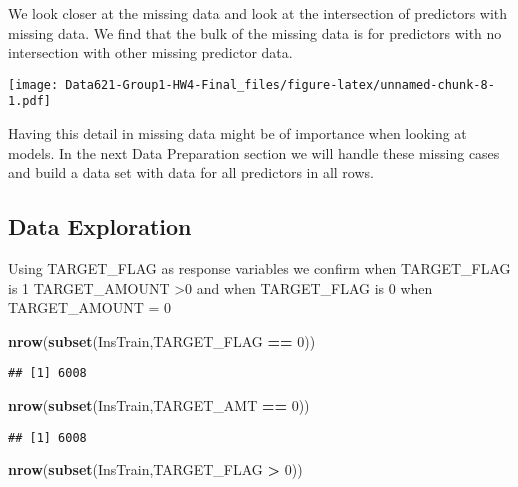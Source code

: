 \documentclass[]{article}
\newenvironment{Shaded}{\begin{snugshade}}{\end{snugshade}}
\newcommand{\DecValTok}[1]{\textcolor[rgb]{0.00,0.00,0.81}{#1}}
\newcommand{\KeywordTok}[1]{\textcolor[rgb]{0.13,0.29,0.53}{\textbf{#1}}}
\newcommand{\NormalTok}[1]{#1}
\newcommand{\OperatorTok}[1]{\textcolor[rgb]{0.81,0.36,0.00}{\textbf{#1}}}
\newcommand{\StringTok}[1]{\textcolor[rgb]{0.31,0.60,0.02}{#1}}
\begin{document}
We look closer at the missing data and look at the intersection of
predictors with missing data. We find that the bulk of the missing data
is for predictors with no intersection with other missing predictor
data.

\texttt{[image: Data621-Group1-HW4-Final\_files/figure-latex/unnamed-chunk-8-1.pdf]}

Having this detail in missing data might be of importance when looking
at models. In the next Data Preparation section we will handle these
missing cases and build a data set with data for all predictors in all
rows.

\hypertarget{data-exploration-1}{%
\subsection{Data Exploration}\label{data-exploration-1}}

Using TARGET\_FLAG as response variables we confirm when TARGET\_FLAG is
1 TARGET\_AMOUNT \textgreater0 and when TARGET\_FLAG is 0 when
TARGET\_AMOUNT = 0

\begin{Shaded}
\begin{Highlighting}[]
\KeywordTok{nrow}\NormalTok{(}\KeywordTok{subset}\NormalTok{(InsTrain,TARGET_FLAG }\OperatorTok{==}\StringTok{ }\DecValTok{0}\NormalTok{))}
\end{Highlighting}
\end{Shaded}

\begin{verbatim}
## [1] 6008
\end{verbatim}

\begin{Shaded}
\begin{Highlighting}[]
\KeywordTok{nrow}\NormalTok{(}\KeywordTok{subset}\NormalTok{(InsTrain,TARGET_AMT }\OperatorTok{==}\StringTok{ }\DecValTok{0}\NormalTok{))}
\end{Highlighting}
\end{Shaded}

\begin{verbatim}
## [1] 6008
\end{verbatim}

\begin{Shaded}
\begin{Highlighting}[]
\KeywordTok{nrow}\NormalTok{(}\KeywordTok{subset}\NormalTok{(InsTrain,TARGET_FLAG }\OperatorTok{>}\StringTok{ }\DecValTok{0}\NormalTok{))}
\end{Highlighting}
\end{Shaded}
\end{document}
